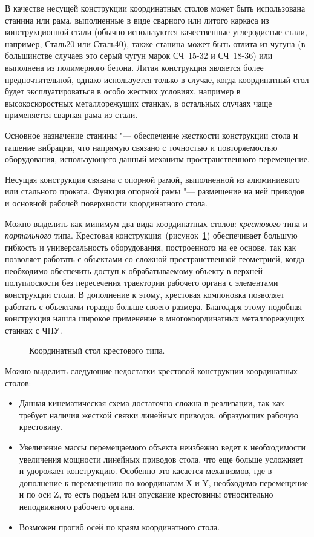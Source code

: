 В качестве несущей конструкции координатных столов может быть использована станина или рама, выполненные в виде сварного или литого каркаса из конструкционной стали (обычно используются качественные углеродистые стали, например, Сталь20 или Сталь40), также станина может быть отлита из чугуна (в большинстве случаев это серый чугун марок СЧ~15-32 и СЧ~18-36) или выполнена из полимерного бетона. Литая конструкция является более предпочтительной, однако используется только в случае, когда координатный стол будет эксплуатироваться в особо жестких условиях, например в высокоскоростных металлорежущих станках, в остальных случаях чаще применяется сварная рама из стали.

Основное назначение станины "--- обеспечение жесткости конструкции стола и гашение вибрации, что напрямую связано с точностью и повторяемостью оборудования, использующего данный механизм пространственного перемещение.

Несущая конструкция связана с опорной рамой, выполненной из алюминиевого или стального проката. Функция опорной рамы "--- размещение на ней приводов и основной рабочей поверхности координатного стола.

Можно выделить как минимум два вида координатных столов: \textit{крестового} типа и \textit{портального} типа. Крестовая конструкция~(рисунок~\cref{fig:cross}) обеспечивает большую гибкость и универсальность оборудования, построенного на ее основе, так как позволяет работать с объектами со сложной пространственной геометрией, когда необходимо обеспечить доступ к обрабатываемому объекту в верхней полуплоскости без пересечения траектории рабочего органа с элементами конструкции стола. В дополнение к этому, крестовая компоновка позволяет работать с объектами гораздо больше своего размера. Благодаря этому подобная конструкция нашла широкое применение в многокоординатных металлорежущих станках с ЧПУ.

\begin{figure}[ht]
	\caption{Координатный стол крестового типа.}\label{fig:cross}
\end{figure}

Можно выделить следующие недостатки крестовой конструкции координатных столов:

\begin{itemize}
	\item Данная кинематическая схема достаточно сложна в реализации, так как требует наличия жесткой связки линейных приводов, образующих рабочую крестовину.
	
	\item Увеличение массы перемещаемого объекта неизбежно ведет к необходимости увеличения мощности линейных приводов стола, что еще больше усложняет и удорожает конструкцию. Особенно это касается механизмов, где в дополнение к перемещению по координатам Х и Y, необходимо перемещение и по оси Z, то есть подъем или опускание крестовины относительно неподвижного рабочего органа. 
	
	\item Возможен прогиб осей по краям координатного стола.
\end{itemize}

